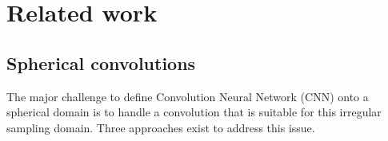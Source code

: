 \documentclass[final,twocolumn,3p,times,authoryear]{elsarticle}
\newcommand{\todo}[1]{{\color[rgb]{.6,.1,.6}{#1}}}
\newcommand{\1}{\b{1}}              %
\newcommand{\0}{\b{0}}              %
\begin{document}






\section{Related work}
\label{sec:related}



\subsection{Spherical convolutions}
The major challenge to define Convolution Neural Network (CNN) onto a
spherical domain is to handle a convolution that is suitable for this irregular sampling domain.
Three approaches exist to address this issue.
\end{document}
